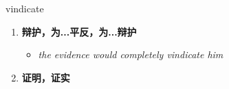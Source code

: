 
\begin{frame}
{\huge vindicate}
\begin{center}
\begin{enumerate}\Large
  \item \textbf{辩护，为...平反，为...辩护}
  \begin{itemize}
    \item \em{\Large{the evidence would completely vindicate him}}
  \end{itemize}
  \item \textbf{证明，证实}
\end{enumerate}
\end{center}
\end{frame}
